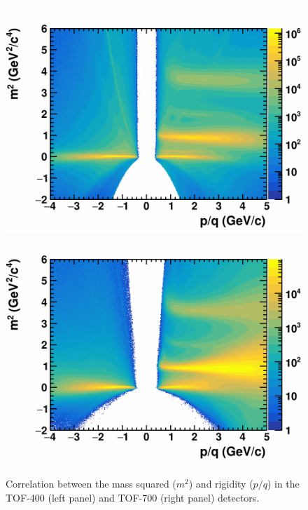     \begin{figure}[H]
        \begin{center}
            \includegraphics[width=0.49\linewidth]{../pict/QA_RunByRun_24.12/H2_NoRuns/cut5_h2_tr_pq_tr_m2_tof400.png}
            \includegraphics[width=0.49\linewidth]{../pict/QA_RunByRun_24.12/H2_NoRuns/cut5_h2_tr_pq_tr_m2_tof700.png}
            \vspace{-3mm}
            \caption{Correlation between the mass squared ($m^2$) and rigidity ($p/q$) in the TOF-400 (left panel) and TOF-700 (right panel) detectors.}
        \end{center}
        \label{m2_TOF}
        \vspace{-5mm}
    \end{figure}

